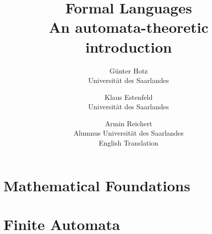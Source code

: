 \documentclass{amsbook}
\begin{document}
\title{
	Formal Languages\\
	An automata-theoretic introduction}

\author{
	G\"unter Hotz\\
	Universit\"at des Saarlandes
\and
	Klaus Estenfeld\\
	Universit\"at des Saarlandes
\and
	Armin Reichert\\
	Alumnus Universit\"at des Saarlandes\\
	English Translation
}

\maketitle


\tableofcontents


\chapter{Mathematical Foundations}







\chapter{Finite Automata}



\end{document}
